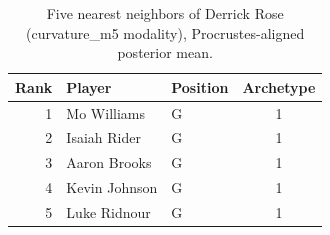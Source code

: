 \begin{table}[htbp]
  \centering\small
  \begin{tabular}{rllc}
    \toprule
    Rank & Player & Position & Archetype \\
    \midrule
    1 & Mo Williams & G & 1 \\
    2 & Isaiah Rider & G & 1 \\
    3 & Aaron Brooks & G & 1 \\
    4 & Kevin Johnson & G & 1 \\
    5 & Luke Ridnour & G & 1 \\
    \bottomrule
  \end{tabular}
  \caption{Five nearest neighbors of Derrick Rose (curvature_m5 modality), Procrustes-aligned posterior mean.}
  \label{tab:Derrick_Rose_neighbors_curvature_m5}
\end{table}

